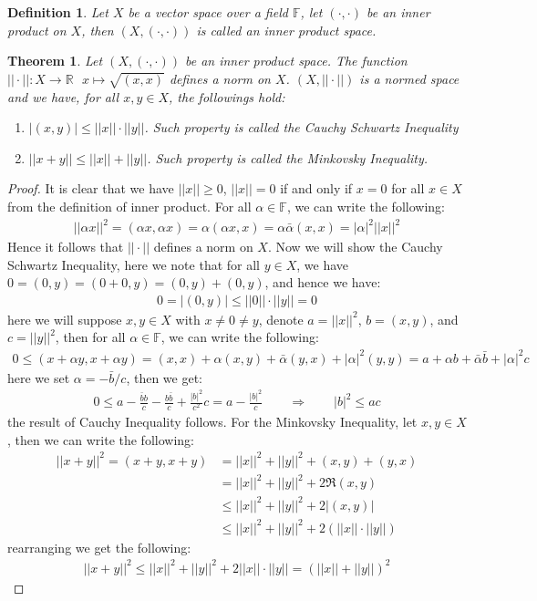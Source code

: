 \documentclass[11pt]{book}
\theoremstyle{break}
\theoremstyle{break}
\newtheorem{thm}{Theorem}[section]
\newtheorem{defn}{Definition}[corL]
\newcommand{\R}{\mathbb{R}}
\begin{document}
\begin{defn}
Let $X$ be a vector space over a field $\mathbb{F}$, let $(\cdot, \cdot)$ be an inner product on $X$, then $(X,(\cdot, \cdot))$ is called an inner product space. 
\end{defn}
\begin{thm}
Let $(X,(\cdot, \cdot))$ be an inner product space. The function $||\cdot ||: X \to \R\ \ \ x\mapsto \sqrt{(x,x)}$ defines a norm on $X$. $(X,||\cdot ||)$ is a normed space and we have, for all $x,y \in X$, the followings hold:
\begin{enumerate}[topsep=3pt,itemsep=-1ex,partopsep=1ex,parsep=1ex]
\item $|(x,y)| \leq ||x||\cdot ||y||$. Such property is called the Cauchy Schwartz Inequality
\item $||x+y|| \leq ||x|| + ||y||$. Such property is called the Minkovsky Inequality.
\end{enumerate}
\end{thm}
\begin{proof}
It is clear that we have $||x||\geq 0$, $||x|| = 0$ if and only if $x = 0$ for all $x \in X$ from the definition of inner product. For all $\alpha \in \mathbb{F}$, we can write the following:
\begin{align*}
||\alpha x||^2 = (\alpha x, \alpha x) = \alpha (\alpha x, x) = \alpha \bar{\alpha}(x,x) = |\alpha|^2 ||x||^2
\end{align*}
Hence it follows that $||\cdot ||$ defines a norm on $X$. Now we will show the Cauchy Schwartz Inequality, here we note that for all $y \in X$, we have $0=(0,y) =(0+0,y) = (0,y) + (0,y) $, and hence we have:
\begin{align*}
0 = |(0,y)| \leq ||0||\cdot ||y|| = 0
\end{align*}
here we will suppose $x,y \in X$ with $x\neq 0 \neq y$, denote $a = ||x||^2$, $b = (x,y)$, and $c = ||y||^2$, then for all $\alpha \in \mathbb{F}$, we can write the following:
\begin{align*}
0 \leq (x+ \alpha y, x+ \alpha y) = (x,x) + \alpha (x,y) + \bar{\alpha}(y,x) + |\alpha|^2 ( y , y) = a+\alpha b + \bar{\alpha}\bar{b} + |\alpha|^2 c
\end{align*}
here we set $\alpha = -\bar{b}/c$, then we get:
\begin{align*}
 0 \leq a - \frac{\bar{b}b}{c}-\frac{b \bar{b}}{c}+ \frac{|b|^2}{c^2}c  = a - \frac{|b|^2}{c} \qquad \Rightarrow \qquad |b|^2 \leq ac
\end{align*}
the result of Cauchy Inequality follows. For the Minkovsky Inequality, let $x,y \in X$, then we can write the following:
\begin{align*}
||x+y||^2 = (x+y, x+y) &= ||x||^2 + ||y||^2 + (x,y) + (y,x) \\
&= ||x||^2 + ||y||^2 + 2\Re(x,y) \\
&\leq ||x||^2 + ||y||^2 + 2|(x,y)|\\\
&\leq ||x||^2 + ||y||^2 + 2\left(||x||\cdot ||y||\right)
\end{align*}
rearranging we get the following:
\begin{align*}
||x+y||^2 \leq ||x||^2 + ||y||^2 + 2||x||\cdot ||y|| = \left( ||x|| + ||y||\right)^2
\end{align*}
\end{proof}
\end{document}
